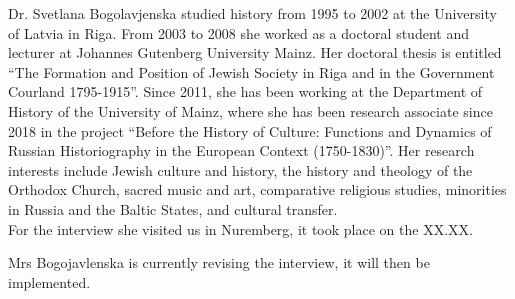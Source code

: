 
Dr. Svetlana Bogolavjenska studied history from 1995 to 2002 at the University of Latvia in Riga. From 2003 to 2008 she worked as a doctoral student and lecturer at Johannes Gutenberg University Mainz. Her doctoral thesis is entitled "`The Formation and Position of Jewish Society in Riga and in the Government Courland 1795-1915"'. Since 2011, she has been working at the Department of History of the University of Mainz, where she has been research associate since 2018 in the project "`Before the History of Culture: Functions and Dynamics of Russian Historiography in the European Context (1750-1830)"'. Her research interests include Jewish culture and history, the history and theology of the Orthodox Church, sacred music and art, comparative religious studies, minorities in Russia and the Baltic States, and cultural transfer. \\
For the interview she visited us in Nuremberg, it took place on the XX.XX. 

Mrs Bogojavlenska is currently revising the interview, it will then be implemented.